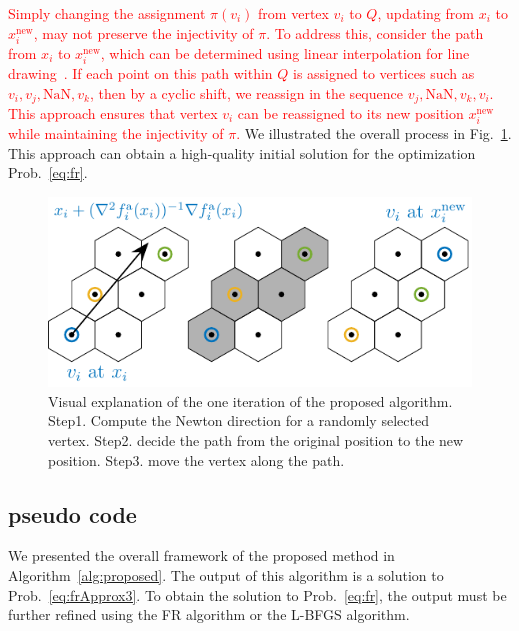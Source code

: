 \documentclass[dvipdfmx,10pt,journal,compsoc]{IEEEtran}
\newcommand{\red}[1]{\textcolor{red}{#1}}
\begin{document}
\red{
    Simply changing the assignment $\pi(v_i)$ from vertex $v_i$ to $Q$, updating from $x_i$ to $x_i^\mathrm{new}$, may not preserve the injectivity of $\pi$. To address this, consider the path from $x_i$ to $x_i^\mathrm{new}$, which can be determined using linear interpolation for line drawing~\cite{patelHexagonalGrids2013}. If each point on this path within $Q$ is assigned to vertices such as $v_i, v_j, \text{NaN}, v_k$, then by a cyclic shift, we reassign in the sequence $v_j, \text{NaN}, v_k, v_i$. This approach ensures that vertex $v_i$ can be reassigned to its new position $x_i^\mathrm{new}$ while maintaining the injectivity of $\pi$.
}
We illustrated the overall process in Fig.~\ref{fig:hex}.
This approach can obtain a high-quality initial solution for the optimization Prob.~\eqref{eq:fr}.

\begin{figure}[t]
    \centering
    \includegraphics[width=\columnwidth]{hex/hex.pdf}
    \caption{Visual explanation of the one iteration of the proposed algorithm. Step1. Compute the Newton direction for a randomly selected vertex. Step2. decide the path from the original position to the new position. Step3. move the vertex along the path.}
    \label{fig:hex}
\end{figure}

\subsection{pseudo code}\label{ssec:pseudoCode}

We presented the overall framework of the proposed method in Algorithm~\ref{alg:proposed}.
The output of this algorithm is a solution to Prob.~\eqref{eq:frApprox3}.
To obtain the solution to Prob.~\eqref{eq:fr}, the output must be further refined using the FR algorithm or the L-BFGS algorithm.
\end{document}
